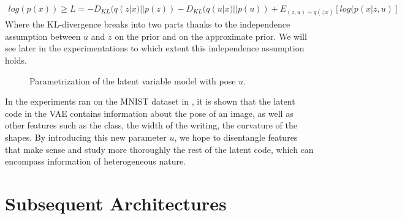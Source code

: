 \documentclass[letterpaper, twoside]{article}
\begin{document}
\begin{align}
log(p(x)) \geq L = - D_{KL}(q(z|x)||p(z)) - D_{KL}(q(u|x)||p(u)) + E_{(z, u)\sim q(.|x)}[log(p(x| z, u)]
\end{align}
 Where the KL-divergence breaks into two parts thanks to the independence assumption between $u$ and $z$ on the prior and on the approximate prior. We will see later in the experimentations to which extent this independence assumption holds.


    \begin{figure}[h]
    \centering
    \caption{Parametrization of the latent variable model with pose $u$.}
    \label{tvaegraphmodel}
    \end{figure}

    In the experiments ran on the MNIST dataset \cite{mnistlecun} in \cite{Kingma.aevb}, it is shown that the latent code in the VAE contains information about the pose of an image, as well as other features such as the class, the width of the writing, the curvature of the shapes. By introducing this new parameter $u$, we hope to disentangle features that make sense and study more thoroughly the rest of the latent code, which can encompass information of heterogeneous nature.

\section{Subsequent Architectures}
\end{document}
